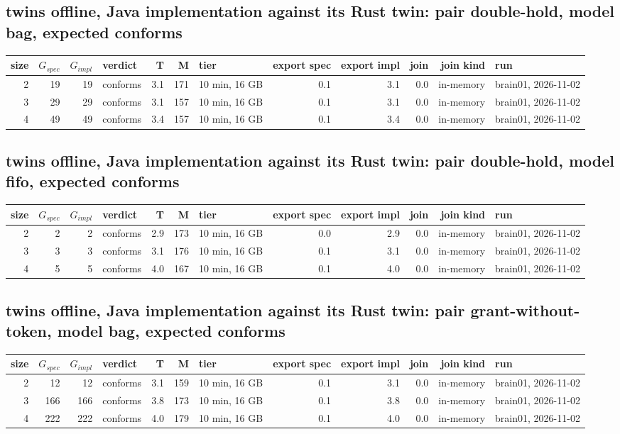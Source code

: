 \documentclass[10pt]{article}
\begin{document}
\subsection*{twins offline, Java implementation against its Rust twin: pair \textsf{double-hold}, model bag, expected conforms}
\begin{longtable}{@{}rrrlrrlrrrrl@{}}
\toprule
size & $G_{\mathit{spec}}$ & $G_{\mathit{impl}}$ & verdict & T & M & tier & export spec & export impl & join & join kind & run \\
\midrule
\endhead
\color{red} 2 & 19 & 19 & conforms & 3.1 & 171 & 10 min, 16 GB & 0.1 & 3.1 & 0.0 & in-memory & brain01, 2026-11-02 \\
\color{red} 3 & 29 & 29 & conforms & 3.1 & 157 & 10 min, 16 GB & 0.1 & 3.1 & 0.0 & in-memory & brain01, 2026-11-02 \\
\color{red} 4 & 49 & 49 & conforms & 3.4 & 157 & 10 min, 16 GB & 0.1 & 3.4 & 0.0 & in-memory & brain01, 2026-11-02 \\
\bottomrule
\end{longtable}
\subsection*{twins offline, Java implementation against its Rust twin: pair \textsf{double-hold}, model fifo, expected conforms}
\begin{longtable}{@{}rrrlrrlrrrrl@{}}
\toprule
size & $G_{\mathit{spec}}$ & $G_{\mathit{impl}}$ & verdict & T & M & tier & export spec & export impl & join & join kind & run \\
\midrule
\endhead
\color{red} 2 & 2 & 2 & conforms & 2.9 & 173 & 10 min, 16 GB & 0.0 & 2.9 & 0.0 & in-memory & brain01, 2026-11-02 \\
\color{red} 3 & 3 & 3 & conforms & 3.1 & 176 & 10 min, 16 GB & 0.1 & 3.1 & 0.0 & in-memory & brain01, 2026-11-02 \\
\color{red} 4 & 5 & 5 & conforms & 4.0 & 167 & 10 min, 16 GB & 0.1 & 4.0 & 0.0 & in-memory & brain01, 2026-11-02 \\
\bottomrule
\end{longtable}
\subsection*{twins offline, Java implementation against its Rust twin: pair \textsf{grant-without-token}, model bag, expected conforms}
\begin{longtable}{@{}rrrlrrlrrrrl@{}}
\toprule
size & $G_{\mathit{spec}}$ & $G_{\mathit{impl}}$ & verdict & T & M & tier & export spec & export impl & join & join kind & run \\
\midrule
\endhead
\color{red} 2 & 12 & 12 & conforms & 3.1 & 159 & 10 min, 16 GB & 0.1 & 3.1 & 0.0 & in-memory & brain01, 2026-11-02 \\
\color{red} 3 & 166 & 166 & conforms & 3.8 & 173 & 10 min, 16 GB & 0.1 & 3.8 & 0.0 & in-memory & brain01, 2026-11-02 \\
\color{red} 4 & 222 & 222 & conforms & 4.0 & 179 & 10 min, 16 GB & 0.1 & 4.0 & 0.0 & in-memory & brain01, 2026-11-02 \\
\bottomrule
\end{longtable}
\end{document}
